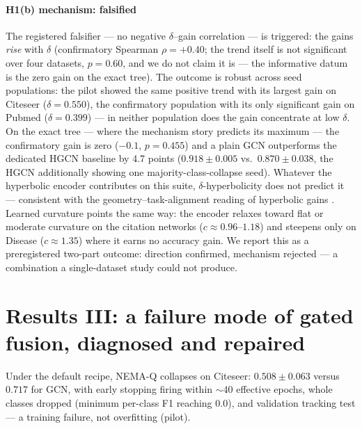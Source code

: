 \documentclass[pdflatex,sn-mathphys-num]{sn-jnl}
\begin{document}
\paragraph{H1(b) mechanism: falsified} The registered falsifier --- no negative $\delta$--gain correlation --- is triggered: the gains \emph{rise} with $\delta$ (confirmatory Spearman $\rho=+0.40$; the trend itself is not significant over four datasets, $p=0.60$, and we do not claim it is --- the informative datum is the zero gain on the exact tree). The outcome is robust across seed populations: the pilot showed the same positive trend with its largest gain on Citeseer ($\delta=0.550$), the confirmatory population with its only significant gain on Pubmed ($\delta=0.399$) --- in neither population does the gain concentrate at low $\delta$. On the exact tree --- where the mechanism story predicts its maximum --- the confirmatory gain is zero ($-0.1$, $p=0.455$) and a plain GCN outperforms the dedicated HGCN baseline by 4.7 points ($0.918\pm0.005$ vs.\ $0.870\pm0.038$, the HGCN additionally showing one majority-class-collapse seed). Whatever the hyperbolic encoder contributes on this suite, $\delta$-hyperbolicity does not predict it --- consistent with the geometry--task-alignment reading of hyperbolic gains \cite{alignment2026hyperbolic}. Learned curvature points the same way: the encoder relaxes toward flat or moderate curvature on the citation networks ($c\approx0.96$--$1.18$) and steepens only on Disease ($c\approx1.35$) where it earns no accuracy gain. We report this as a preregistered two-part outcome: direction confirmed, mechanism rejected --- a combination a single-dataset study could not produce.

\section{Results III: a failure mode of gated fusion, diagnosed and repaired}\label{sec:failure}

Under the default recipe, NEMA-Q collapses on Citeseer: $0.508\pm0.063$ versus $0.717$ for GCN, with early stopping firing within ${\sim}40$ effective epochs, whole classes dropped (minimum per-class F1 reaching $0.0$), and validation tracking test --- a training failure, not overfitting (pilot).
\end{document}
